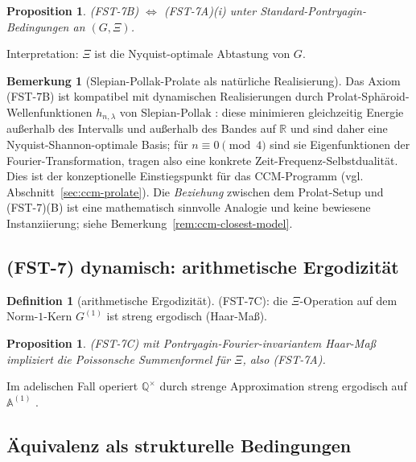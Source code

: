 \documentclass[11pt,a4paper]{article}
\theoremstyle{plain}
\newtheorem{proposition}[theorem]{Proposition}
\theoremstyle{definition}
\newtheorem{definition}[theorem]{Definition}
\newtheorem{remark}[theorem]{Bemerkung}
\newcommand{\R}{\mathbb{R}}
\newcommand{\Q}{\mathbb{Q}}
\newcommand{\A}{\mathbb{A}}
\begin{document}
\begin{proposition}
\label{prop:B-iff-A}
(FST-7B) $\Leftrightarrow$ (FST-7A)(i) unter Standard-Pontryagin-Bedingungen an $(G, \Xi)$.
\end{proposition}

Interpretation: $\Xi$ ist die Nyquist-optimale Abtastung von $G$.

\begin{remark}[Slepian-Pollak-Prolate als natürliche Realisierung]
\label{rem:b-view-prolate}
Das Axiom (FST-7B) ist kompatibel mit dynamischen Realisierungen durch
Prolat-Sphäroid-Wellenfunktionen $h_{n,\lambda}$ von Slepian-Pollak
\cite{SlepianPollack1961}: diese minimieren gleichzeitig
Energie außerhalb des Intervalls und außerhalb des Bandes auf $\R$ und sind
daher eine Nyquist-Shannon-optimale Basis; für $n \equiv 0 \pmod 4$ sind sie
Eigenfunktionen der Fourier-Transformation, tragen also eine konkrete
Zeit-Frequenz-Selbstdualität. Dies ist der konzeptionelle Einstiegspunkt
für das CCM-Programm (vgl. Abschnitt~\ref{sec:ccm-prolate}). Die
\emph{Beziehung} zwischen dem Prolat-Setup und (FST-7)(B) ist eine
mathematisch sinnvolle Analogie und keine bewiesene Instanziierung;
siehe Bemerkung~\ref{rem:ccm-closest-model}.
\end{remark}

\subsection{(FST-7) dynamisch: arithmetische Ergodizität}

\begin{definition}[arithmetische Ergodizität]
\label{def:fst7-c}
(FST-7C): die $\Xi$-Operation auf dem Norm-$1$-Kern $G^{(1)}$ ist streng
ergodisch (Haar-Maß).
\end{definition}

\begin{proposition}
\label{prop:C-implies-A}
(FST-7C) mit Pontryagin-Fourier-invariantem Haar-Maß impliziert
die Poissonsche Summenformel für $\Xi$, also (FST-7A).
\end{proposition}

Im adelischen Fall operiert $\Q^\times$ durch strenge Approximation streng ergodisch auf
$\A^{(1)}$ \cite{CasselsFrohlich}.

\subsection{Äquivalenz als strukturelle Bedingungen}
\end{document}
